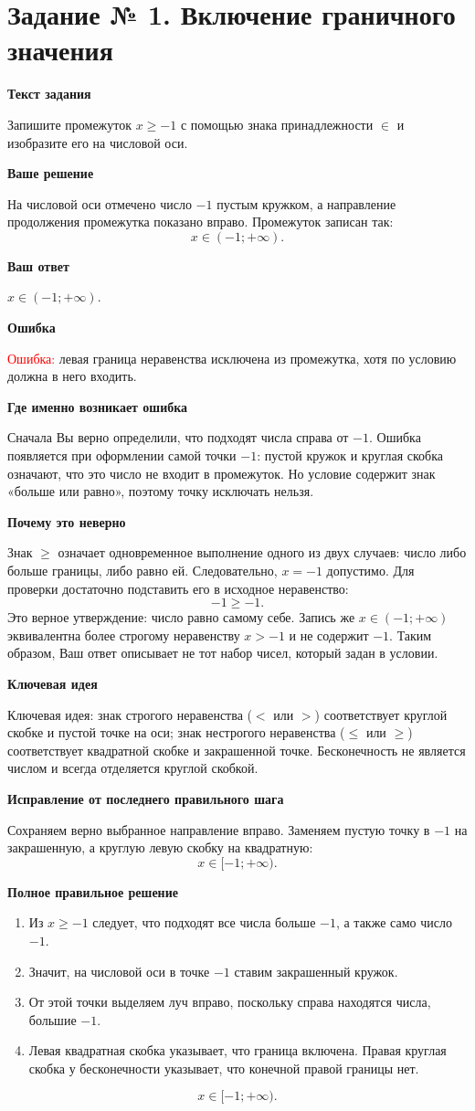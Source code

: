 \documentclass[12pt,a4paper]{article}
\newcommand{\reviewlabel}[1]{\medskip\noindent\textbf{#1}\par}
\begin{document}
\label{task:1}
\section*{Задание № 1. Включение граничного значения}
\reviewlabel{Текст задания}
Запишите промежуток $x\ge -1$ с помощью знака принадлежности $\in$ и изобразите его на числовой оси.

\reviewlabel{Ваше решение}
На числовой оси отмечено число $-1$ пустым кружком, а направление продолжения промежутка показано вправо. Промежуток записан так:
\[
 x\in(-1;+\infty).
\]

\reviewlabel{Ваш ответ}
$\displaystyle x\in(-1;+\infty)$.

\reviewlabel{Ошибка}
\textcolor{red}{Ошибка:} левая граница неравенства исключена из промежутка, хотя по условию должна в него входить.

\reviewlabel{Где именно возникает ошибка}
Сначала Вы верно определили, что подходят числа справа от $-1$. Ошибка появляется при оформлении самой точки $-1$: пустой кружок и круглая скобка означают, что это число не входит в промежуток. Но условие содержит знак «больше или равно», поэтому точку исключать нельзя.

\reviewlabel{Почему это неверно}
Знак $\ge$ означает одновременное выполнение одного из двух случаев: число либо больше границы, либо равно ей. Следовательно, $x=-1$ допустимо. Для проверки достаточно подставить его в исходное неравенство:
\[
 -1\ge -1.
\]
Это верное утверждение: число равно самому себе. Запись же $x\in(-1;+\infty)$ эквивалентна более строгому неравенству $x>-1$ и не содержит $-1$. Таким образом, Ваш ответ описывает не тот набор чисел, который задан в условии.

\reviewlabel{Ключевая идея}
\textcolor{blue!60!black}{Ключевая идея:} знак строгого неравенства ($<$ или $>$) соответствует круглой скобке и пустой точке на оси; знак нестрогого неравенства ($\le$ или $\ge$) соответствует квадратной скобке и закрашенной точке. Бесконечность не является числом и всегда отделяется круглой скобкой.

\reviewlabel{Исправление от последнего правильного шага}
Сохраняем верно выбранное направление вправо. Заменяем пустую точку в $-1$ на закрашенную, а круглую левую скобку на квадратную:
\[
 x\in\boxed{[-1;+\infty)}.
\]

\reviewlabel{Полное правильное решение}
\begin{enumerate}
\item Из $x\ge-1$ следует, что подходят все числа больше $-1$, а также само число $-1$.
\item Значит, на числовой оси в точке $-1$ ставим закрашенный кружок.
\item От этой точки выделяем луч вправо, поскольку справа находятся числа, большие $-1$.
\item Левая квадратная скобка указывает, что граница включена. Правая круглая скобка у бесконечности указывает, что конечной правой границы нет.
\end{enumerate}
\[
\boxed{x\in[-1;+\infty).}
\]
\end{document}
